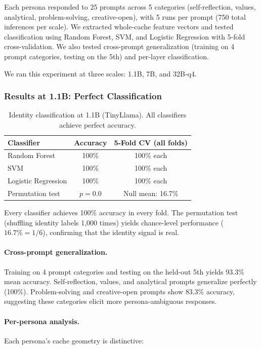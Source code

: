 \documentclass[11pt,a4paper]{article}
\begin{document}
Each persona responded to 25 prompts across 5 categories (self-reflection, values, analytical, problem-solving, creative-open), with 5 runs per prompt (750 total inferences per scale). We extracted whole-cache feature vectors and tested classification using Random Forest, SVM, and Logistic Regression with 5-fold cross-validation. We also tested cross-prompt generalization (training on 4 prompt categories, testing on the 5th) and per-layer classification.

We ran this experiment at three scales: 1.1B, 7B, and 32B-q4.

\subsubsection{Results at 1.1B: Perfect Classification}

\begin{table}[H]
\centering
\caption{Identity classification at 1.1B (TinyLlama). All classifiers achieve perfect accuracy.}
\label{tab:identity_1.1B}
\begin{tabular}{lcc}
\toprule
\textbf{Classifier} & \textbf{Accuracy} & \textbf{5-Fold CV (all folds)} \\
\midrule
Random Forest & 100\% & 100\% each \\
SVM & 100\% & 100\% each \\
Logistic Regression & 100\% & 100\% each \\
\midrule
Permutation test & $p = 0.0$ & Null mean: 16.7\% \\
\bottomrule
\end{tabular}
\end{table}

Every classifier achieves 100\% accuracy in every fold. The permutation test (shuffling identity labels 1,000 times) yields chance-level performance ($16.7\% = 1/6$), confirming that the identity signal is real.

\paragraph{Cross-prompt generalization.} Training on 4 prompt categories and testing on the held-out 5th yields 93.3\% mean accuracy. Self-reflection, values, and analytical prompts generalize perfectly (100\%). Problem-solving and creative-open prompts show 83.3\% accuracy, suggesting these categories elicit more persona-ambiguous responses.

\paragraph{Per-persona analysis.} Each persona's cache geometry is distinctive:
\end{document}
